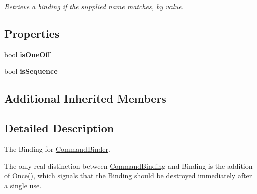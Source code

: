 \begin{DoxyCompactItemize}
\begin{DoxyCompactList}\small\item\em Retrieve a binding if the supplied name matches, by value. \end{DoxyCompactList}\end{DoxyCompactItemize}
\subsection*{Properties}
\begin{DoxyCompactItemize}
\item 
\hypertarget{classstrange_1_1extensions_1_1command_1_1impl_1_1_command_binding_a310f0164dcd9324688d1e0000174dcaa}{bool {\bfseries is\-One\-Off}}\label{classstrange_1_1extensions_1_1command_1_1impl_1_1_command_binding_a310f0164dcd9324688d1e0000174dcaa}

\item 
\hypertarget{classstrange_1_1extensions_1_1command_1_1impl_1_1_command_binding_ab2a00dd6d304cd3a92588aeecf9b7097}{bool {\bfseries is\-Sequence}}\label{classstrange_1_1extensions_1_1command_1_1impl_1_1_command_binding_ab2a00dd6d304cd3a92588aeecf9b7097}

\end{DoxyCompactItemize}
\subsection*{Additional Inherited Members}


\subsection{Detailed Description}
The Binding for \hyperlink{classstrange_1_1extensions_1_1command_1_1impl_1_1_command_binder}{Command\-Binder}. 

The only real distinction between \hyperlink{classstrange_1_1extensions_1_1command_1_1impl_1_1_command_binding}{Command\-Binding} and Binding is the addition of {\ttfamily \hyperlink{classstrange_1_1extensions_1_1command_1_1impl_1_1_command_binding_a8e9748be1b68811006095c2b91b226f6}{Once()}}, which signals that the Binding should be destroyed immediately after a single use. 

